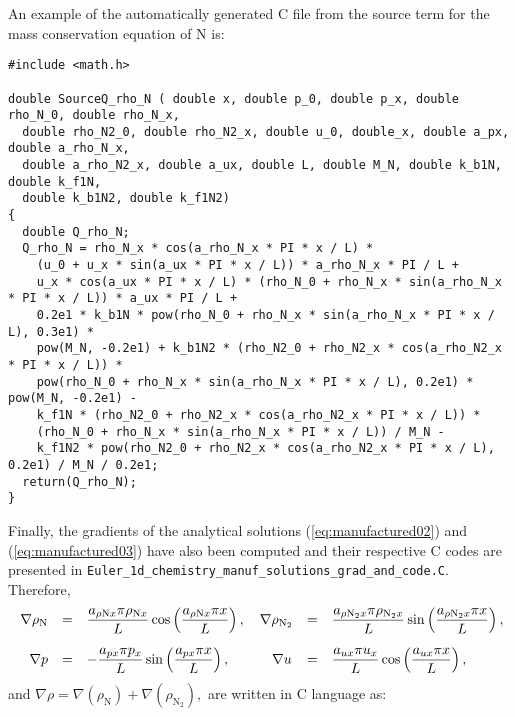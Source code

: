 \documentclass[10pt]{article}
\begin{document}
An example of the automatically generated C file from the source term for the mass conservation equation of N is:
\begin{small}
\begin{verbatim}
#include <math.h>

double SourceQ_rho_N ( double x, double p_0, double p_x, double rho_N_0, double rho_N_x,
  double rho_N2_0, double rho_N2_x, double u_0, double_x, double a_px, double a_rho_N_x,
  double a_rho_N2_x, double a_ux, double L, double M_N, double k_b1N, double k_f1N,
  double k_b1N2, double k_f1N2)
{
  double Q_rho_N;
  Q_rho_N = rho_N_x * cos(a_rho_N_x * PI * x / L) *
    (u_0 + u_x * sin(a_ux * PI * x / L)) * a_rho_N_x * PI / L +
    u_x * cos(a_ux * PI * x / L) * (rho_N_0 + rho_N_x * sin(a_rho_N_x * PI * x / L)) * a_ux * PI / L +
    0.2e1 * k_b1N * pow(rho_N_0 + rho_N_x * sin(a_rho_N_x * PI * x / L), 0.3e1) *
    pow(M_N, -0.2e1) + k_b1N2 * (rho_N2_0 + rho_N2_x * cos(a_rho_N2_x * PI * x / L)) *
    pow(rho_N_0 + rho_N_x * sin(a_rho_N_x * PI * x / L), 0.2e1) * pow(M_N, -0.2e1) -
    k_f1N * (rho_N2_0 + rho_N2_x * cos(a_rho_N2_x * PI * x / L)) *
    (rho_N_0 + rho_N_x * sin(a_rho_N_x * PI * x / L)) / M_N -
    k_f1N2 * pow(rho_N2_0 + rho_N2_x * cos(a_rho_N2_x * PI * x / L), 0.2e1) / M_N / 0.2e1;
  return(Q_rho_N);
}
\end{verbatim}
 \end{small}

Finally, the gradients of the analytical solutions (\ref{eq:manufactured02}) and (\ref{eq:manufactured03}) have also been computed and their respective C codes are presented in  \texttt{Euler\_1d\_chemistry\_manuf\_solutions\_grad\_and\_code.C}. Therefore,
\begin{equation}
\begin{array}{rrlrl}
\nabla \rho_{\text{N}} &=&  \dfrac{ a_{ \rho \text{N} x} \pi \rho_{\text{N}x} }{L} \cos\left( \dfrac{ a_{\rho \text{N} x} \pi x }{L}\right),
\quad
\nabla \rho_{\text{N}_2} &=&  \dfrac{ a_{ \rho \text{N}_2 x} \pi \rho_{\text{N}_2 x} }{L} \sin\left( \dfrac{ a_{ \rho \text{N}_2 x} \pi x }{L}\right),\vspace{10pt}\\
\quad
%
\nabla p &=& - \dfrac{ a_{px} \pi p_x }{L} \sin\left( \dfrac{ a_{px} \pi x }{L}\right),
\quad\quad\quad
%
\nabla u &=& \dfrac{ a_{ux} \pi u_x}{L} \cos\left( \dfrac{ a_{ux} \pi x }{L}\right),
\end{array}
\end{equation}
and $\nabla \rho =\nabla \left( \rho_\text{N}\right) + \nabla \left(\rho_{\text{N}_2} \right),$ are written in C language as:
\end{document}
